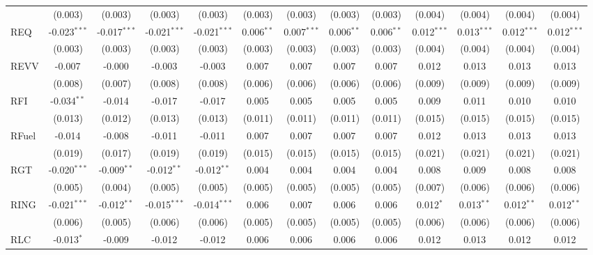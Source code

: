 \begin{table}[!htbp]
\begin{tabular}{@{\extracolsep{5pt}}lcccccccccccc}
  & (0.003) & (0.003) & (0.003) & (0.003) & (0.003) & (0.003) & (0.003) & (0.003) & (0.004) & (0.004) & (0.004) & (0.004) \\
 REQ & -0.023$^{***}$ & -0.017$^{***}$ & -0.021$^{***}$ & -0.021$^{***}$ & 0.006$^{**}$ & 0.007$^{***}$ & 0.006$^{**}$ & 0.006$^{**}$ & 0.012$^{***}$ & 0.013$^{***}$ & 0.012$^{***}$ & 0.012$^{***}$ \\
  & (0.003) & (0.003) & (0.003) & (0.003) & (0.003) & (0.003) & (0.003) & (0.003) & (0.004) & (0.004) & (0.004) & (0.004) \\
 REVV & -0.007$^{}$ & -0.000$^{}$ & -0.003$^{}$ & -0.003$^{}$ & 0.007$^{}$ & 0.007$^{}$ & 0.007$^{}$ & 0.007$^{}$ & 0.012$^{}$ & 0.013$^{}$ & 0.013$^{}$ & 0.013$^{}$ \\
  & (0.008) & (0.007) & (0.008) & (0.008) & (0.006) & (0.006) & (0.006) & (0.006) & (0.009) & (0.009) & (0.009) & (0.009) \\
 RFI & -0.034$^{**}$ & -0.014$^{}$ & -0.017$^{}$ & -0.017$^{}$ & 0.005$^{}$ & 0.005$^{}$ & 0.005$^{}$ & 0.005$^{}$ & 0.009$^{}$ & 0.011$^{}$ & 0.010$^{}$ & 0.010$^{}$ \\
  & (0.013) & (0.012) & (0.013) & (0.013) & (0.011) & (0.011) & (0.011) & (0.011) & (0.015) & (0.015) & (0.015) & (0.015) \\
 RFuel & -0.014$^{}$ & -0.008$^{}$ & -0.011$^{}$ & -0.011$^{}$ & 0.007$^{}$ & 0.007$^{}$ & 0.007$^{}$ & 0.007$^{}$ & 0.012$^{}$ & 0.013$^{}$ & 0.013$^{}$ & 0.013$^{}$ \\
  & (0.019) & (0.017) & (0.019) & (0.019) & (0.015) & (0.015) & (0.015) & (0.015) & (0.021) & (0.021) & (0.021) & (0.021) \\
 RGT & -0.020$^{***}$ & -0.009$^{**}$ & -0.012$^{**}$ & -0.012$^{**}$ & 0.004$^{}$ & 0.004$^{}$ & 0.004$^{}$ & 0.004$^{}$ & 0.008$^{}$ & 0.009$^{}$ & 0.008$^{}$ & 0.008$^{}$ \\
  & (0.005) & (0.004) & (0.005) & (0.005) & (0.005) & (0.005) & (0.005) & (0.005) & (0.007) & (0.006) & (0.006) & (0.006) \\
 RING & -0.021$^{***}$ & -0.012$^{**}$ & -0.015$^{***}$ & -0.014$^{***}$ & 0.006$^{}$ & 0.007$^{}$ & 0.006$^{}$ & 0.006$^{}$ & 0.012$^{*}$ & 0.013$^{**}$ & 0.012$^{**}$ & 0.012$^{**}$ \\
  & (0.006) & (0.005) & (0.006) & (0.006) & (0.005) & (0.005) & (0.005) & (0.005) & (0.006) & (0.006) & (0.006) & (0.006) \\
 RLC & -0.013$^{*}$ & -0.009$^{}$ & -0.012$^{}$ & -0.012$^{}$ & 0.006$^{}$ & 0.006$^{}$ & 0.006$^{}$ & 0.006$^{}$ & 0.012$^{}$ & 0.013$^{}$ & 0.012$^{}$ & 0.012$^{}$ \\

\end{tabular}
\end{table}
